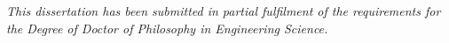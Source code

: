 
\vspace*{\fill}
\vspace*{\fill}
\vspace*{\fill}
\begin{center}
\textit{
This dissertation has been submitted in partial fulfilment of
the requirements for the Degree of Doctor of Philosophy in
Engineering Science.
}
\end{center}

\vspace*{\fill}
\vspace*{\fill}
\vspace*{\fill}
